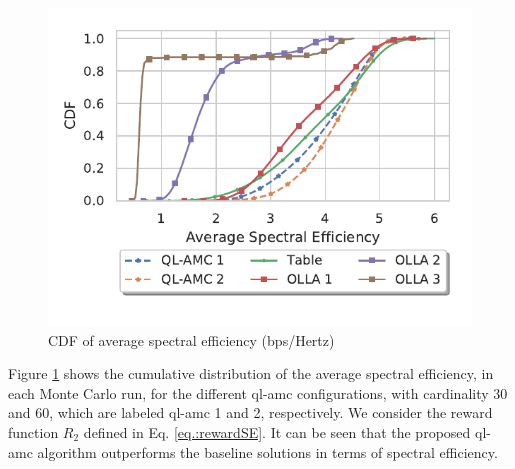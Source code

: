 \begin{figure}[tb]
\centerline{\includegraphics[width=\columnwidth]{figures/chp_amc/SpecEff-Deploy.pdf}}
\vspace{-2ex}
\caption{CDF of average spectral efficiency (bps/Hertz)}
\label{fig:amc-dep-spceff}
\end{figure}

Figure \ref{fig:amc-dep-spceff} shows the cumulative distribution of the average spectral efficiency, in each Monte Carlo run, for the different \gls{ql-amc} configurations, with cardinality 30 and 60, which are labeled \gls{ql-amc} 1 and 2, respectively. We consider the reward function $R_2$ defined in Eq. \eqref{eq.:rewardSE}.
It can be seen that the proposed \gls{ql-amc} algorithm outperforms the baseline solutions in terms of spectral efficiency.





